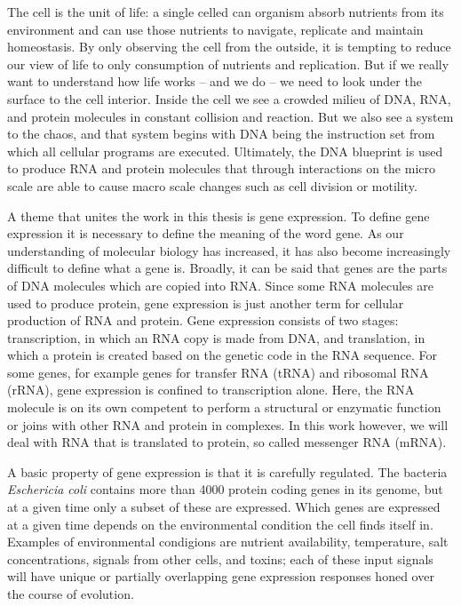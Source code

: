 %

The cell is the unit of life: a single celled can organism absorb nutrients
from its environment and can use those nutrients to navigate, replicate and
maintain homeostasis. By only observing the cell from the outside, it is
tempting to reduce our view of life to only consumption of nutrients and
replication. But if we really want to understand how life works -- and we do --
we need to look under the surface to the cell interior. Inside the cell we see
a crowded milieu of DNA, RNA, and protein molecules in constant collision and
reaction. But we also see a system to the chaos, and that system begins with
DNA being the instruction set from which all cellular programs are executed.
Ultimately, the DNA blueprint is used to produce RNA and protein molecules that
through interactions on the micro scale are able to cause macro scale changes
such as cell division or motility.

A theme that unites the work in this thesis is gene expression. To define gene
expression it is necessary to define the meaning of the word gene. As our
understanding of molecular biology has increased, it has also become
increasingly difficult to define what a gene is. Broadly, it can be said that
genes are the parts of DNA molecules which are copied into RNA. Since some RNA
molecules are used to produce protein, gene expression is just another term for
cellular production of RNA and protein. Gene expression consists of two stages:
transcription, in which an RNA copy is made from DNA, and translation, in which
a protein is created based on the genetic code in the RNA sequence.  For some
genes, for example genes for transfer RNA (tRNA) and ribosomal RNA (rRNA), gene
expression is confined to transcription alone.  Here, the RNA molecule is on
its own competent to perform a structural or enzymatic function or joins with
other RNA and protein in complexes. In this work however, we will deal with RNA
that is translated to protein, so called messenger RNA (mRNA).

A basic property of gene expression is that it is carefully regulated. The
bacteria \textit{Eschericia coli} contains more than 4000 protein coding genes
in its genome, but at a given time only a subset of these are expressed. Which
genes are expressed at a given time depends on the environmental condition the
cell finds itself in. Examples of environmental condigions are nutrient
availability, temperature, salt concentrations, signals from other cells, and
toxins; each of these input signals will have unique or partially overlapping
gene expression responses honed over the course of evolution.

